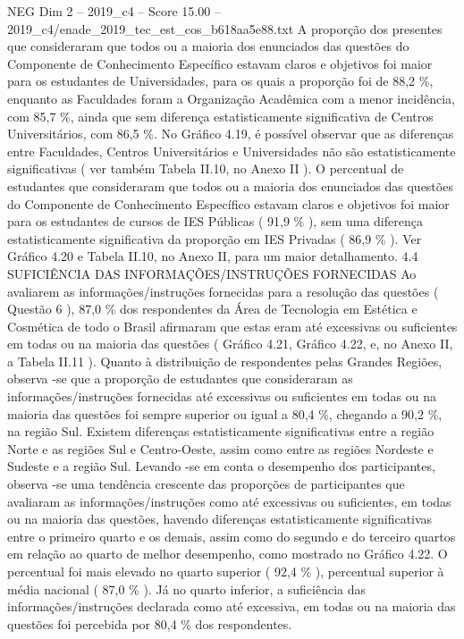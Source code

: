 \begin{textsample}{NEG Dim 2 – 2019\_c4 – Score 15.00 – 2019\_c4/enade\_2019\_tec\_est\_cos\_b618aa5e88.txt}
A proporção dos presentes que consideraram que todos ou a maioria dos enunciados das questões do Componente de Conhecimento Específico estavam claros e objetivos foi maior para os estudantes de Universidades, para os quais a proporção foi de 88,2 \%, enquanto as Faculdades foram a Organização Acadêmica com a menor incidência, com 85,7 \%, ainda que sem diferença estatisticamente significativa de Centros Universitários, com 86,5 \%.
No Gráfico 4.19, é possível observar que as diferenças entre Faculdades, Centros Universitários e Universidades não são estatisticamente significativas ( ver também Tabela II.10, no Anexo II ).
O percentual de estudantes que consideraram que todos ou a maioria dos enunciados das questões do Componente de Conhecimento Específico estavam claros e objetivos foi maior para os estudantes de cursos de IES Públicas ( 91,9 \% ), sem uma diferença estatisticamente significativa da proporção em IES Privadas ( 86,9 \% ).
Ver Gráfico 4.20 e Tabela II.10, no Anexo II, para um maior detalhamento. 4.4 SUFICIÊNCIA DAS INFORMAÇÕES/INSTRUÇÕES FORNECIDAS Ao avaliarem as informações/instruções fornecidas para a resolução das questões ( Questão 6 ), 87,0 \% dos respondentes da Área de Tecnologia em Estética e Cosmética de todo o Brasil afirmaram que estas eram até excessivas ou suficientes em todas ou na maioria das questões ( Gráfico 4.21, Gráfico 4.22, e, no Anexo II, a Tabela II.11 ).
Quanto à distribuição de respondentes pelas Grandes Regiões, observa -se que a proporção de estudantes que consideraram as informações/instruções fornecidas até excessivas ou suficientes em todas ou na maioria das questões foi sempre superior ou igual a 80,4 \%, chegando a 90,2 \%, na região Sul.
Existem diferenças estatisticamente significativas entre a região Norte e as regiões Sul e Centro-Oeste, assim como entre as regiões Nordeste e Sudeste e a região Sul.
Levando -se em conta o desempenho dos participantes, observa -se uma tendência crescente das proporções de participantes que avaliaram as informações/instruções como até excessivas ou suficientes, em todas ou na maioria das questões, havendo diferenças estatisticamente significativas entre o primeiro quarto e os demais, assim como do segundo e do terceiro quartos em relação ao quarto de melhor desempenho, como mostrado no Gráfico 4.22.
O percentual foi mais elevado no quarto superior ( 92,4 \% ), percentual superior à média nacional ( 87,0 \% ).
Já no quarto inferior, a suficiência das informações/instruções declarada como até excessiva, em todas ou na maioria das questões foi percebida por 80,4 \% dos respondentes.

\end{textsample}
